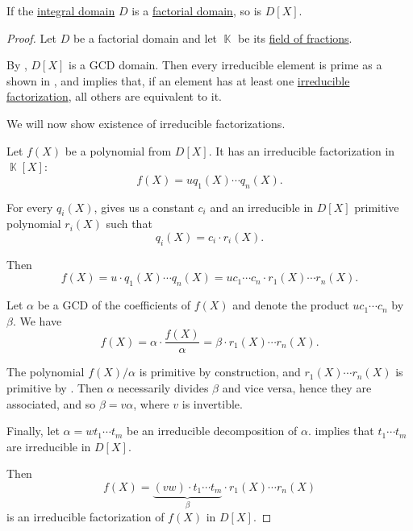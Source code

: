 \begin{proposition}\label{thm:polynomial_ring_over_factorial}
  If the \hyperref[def:integral_domain]{integral domain} \( D \) is a \hyperref[def:factorial_domain]{factorial domain}, so is \( D[X] \).
\end{proposition}
\begin{proof}
  Let \( D \) be a factorial domain and let \( \BbbK \) be its \hyperref[def:field_of_fractions]{field of fractions}.

  By , \( D[X] \) is a GCD domain. Then every irreducible element is prime as a shown in , and  implies that, if an element has at least one \hyperref[def:irreducible_factorization]{irreducible factorization}, all others are equivalent to it.

  We will now show existence of irreducible factorizations.

  Let \( f(X) \) be a polynomial from \( D[X] \). It has an irreducible factorization in \( \BbbK[X] \):
  \begin{equation*}
    f(X) = u q_1(X) \cdots q_n(X).
  \end{equation*}

  For every \( q_i(X) \),  gives us a constant \( c_i \) and an irreducible in \( D[X] \) primitive polynomial \( r_i(X) \) such that
  \begin{equation*}
    q_i(X) = c_i \cdot r_i(X).
  \end{equation*}

  Then
  \begin{equation*}
    f(X)
    =
    u \cdot q_1(X) \cdots q_n(X)
    =
    u c_1 \cdots c_n \cdot r_1(X) \cdots r_n(X).
  \end{equation*}

  Let \( \alpha \) be a GCD of the coefficients of \( f(X) \) and denote the product \( u c_1 \cdots c_n \) by \( \beta \). We have
  \begin{equation*}
    f(X) = \alpha \cdot \frac {f(X)} \alpha = \beta \cdot r_1(X) \cdots r_n(X).
  \end{equation*}

  The polynomial \( f(X) / \alpha \) is primitive by construction, and \( r_1(X) \cdots r_n(X) \) is primitive by . Then \( \alpha \) necessarily divides \( \beta \) and vice versa, hence they are associated, and so \( \beta = v \alpha \), where \( v \) is invertible.

  Finally, let \( \alpha = w t_1 \cdots t_m \) be an irreducible decomposition of \( \alpha \).  implies that \( t_1 \cdots t_m \) are irreducible in \( D[X] \).

  Then
  \begin{equation*}
    f(X) = \underbrace{(v w) \cdot t_1 \cdots t_m}_{\beta} \cdot r_1(X) \cdots r_n(X)
  \end{equation*}
  is an irreducible factorization of \( f(X) \) in \( D[X] \).
\end{proof}
